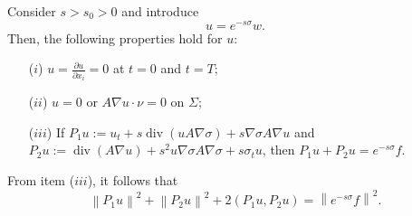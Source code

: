\documentclass[9pt,reqno]{amsart}
\theoremstyle{plain}
\numberwithin{equation}{section}
\numberwithin{theorem}{section}
\DeclareMathOperator*{\Div}{\mathrm{div}}
\begin{document}
	
	Consider $s>s_0>0$ and introduce
	\begin{equation*}
		u=e^{-s\sigma} w.  
	\end{equation*}
	Then, the following properties hold for $u$:
	\begin{itemize}
		\item [($i$)] $u=\frac{\partial u}{\partial x_i}=0$ at $t=0$ and $t=T$;
		\item [($ii$)] $u=0$ or $A\nabla u \cdot \nu =0 $ on $\Sigma$;
		\item [($iii$)] If $P_1 u:=u_t+s \Div(u A \nabla \sigma)+s \nabla \sigma A \nabla u$ and $P_2 u:=\Div(A \nabla u)+s^2 u \nabla \sigma A \nabla \sigma+s \sigma_t u$, then $P_1 u+P_2 u=e^{-s \sigma} f$.
	\end{itemize}
	From item ($iii$), it follows that
	\begin{equation}\label{PP}
		\left\|P_1 u\right\|^2+\left\|P_2 u\right\|^2+2\left(P_1 u, P_2 u\right)=\left\|e^{-s \sigma} f\right\|^2.
	\end{equation}
	
\end{document}
